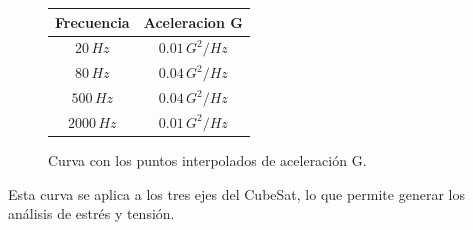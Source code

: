       \begin{figure}[!ht]
        \centering
        \begin{minipage}{0.4\textwidth}
          \centering
          \begin{tabular}{|c|c|}
            \hline
            Frecuencia & Aceleracion G \\ \hline
            $20 \, Hz$ & $0.01 \, G^2/Hz$ \\ \hline
            $80 \, Hz$ & $0.04 \, G^2/Hz$ \\ \hline
            $500 \, Hz$ & $0.04 \, G^2/Hz$ \\ \hline
            $2000 \, Hz$ & $0.01 \, G^2/Hz$ \\ \hline
          \end{tabular}
          \label{tab:accel}
        \end{minipage}
        \hspace{0.05\textwidth}
        \begin{minipage}{0.4\textwidth}
          \caption{Curva con los puntos interpolados de aceleración G.}
          \label{fig:graph_accel}
        \end{minipage}
      \end{figure}

      Esta curva se aplica a los tres ejes del CubeSat, lo que permite generar los análisis de estrés y tensión.

